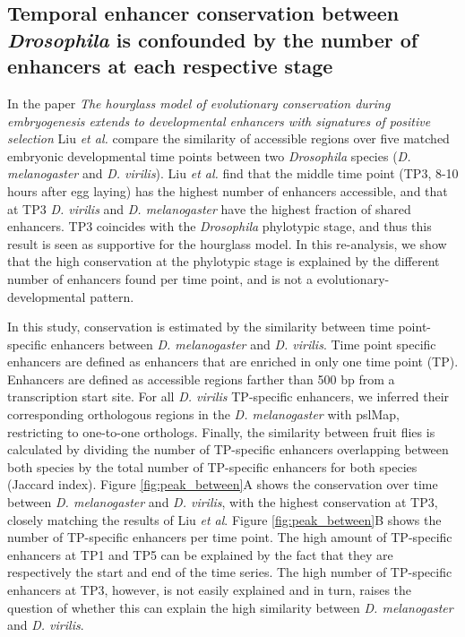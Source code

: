 \subsection{Temporal enhancer conservation between \textit{Drosophila} is confounded by the number of enhancers at each respective stage} \label{subsection:liu}

In the paper \textit{The hourglass model of evolutionary conservation during embryogenesis extends to developmental enhancers with signatures of positive selection}\cite{Liu2021} Liu \textit{et al.} compare the similarity of accessible regions over five matched embryonic developmental time points between two \textit{Drosophila} species (\textit{D. melanogaster} and \textit{D. virilis}). Liu \textit{et al.} find that the middle time point (TP3, 8-10 hours after egg laying) has the highest number of enhancers accessible, and that at TP3 \textit{D. virilis} and \textit{D. melanogaster} have the highest fraction of shared enhancers. TP3 coincides with the \textit{Drosophila} phylotypic stage, and thus this result is seen as supportive for the hourglass model. In this re-analysis, we show that the high conservation at the phylotypic stage is explained by the different number of enhancers found per time point, and is not a evolutionary-developmental pattern.

In this study, conservation is estimated by the similarity between time point-specific enhancers between \textit{D. melanogaster} and \textit{D. virilis}. Time point specific enhancers are defined as enhancers that are enriched in only one time point (TP). Enhancers are defined as accessible regions farther than 500 bp from a transcription start site. For all \textit{D. virilis} TP-specific enhancers, we inferred their corresponding orthologous regions in the \textit{D. melanogaster} with pslMap, restricting to one-to-one orthologs. Finally, the similarity between fruit flies is calculated by dividing the number of TP-specific enhancers overlapping between both species by the total number of TP-specific enhancers for both species (Jaccard index). Figure \ref{fig:peak_between}A shows the conservation over time between \textit{D. melanogaster} and \textit{D. virilis}, with the highest conservation at TP3, closely matching the results of Liu \textit{et al}. Figure \ref{fig:peak_between}B shows the number of  TP-specific enhancers per time point. The high amount of TP-specific enhancers at TP1 and TP5 can be explained by the fact that they are respectively the start and end of the time series. The high number
of TP-specific enhancers at TP3, however, is not easily explained and in turn, raises the question of whether this can explain the high similarity between \textit{D. melanogaster} and \textit{D. virilis}.


